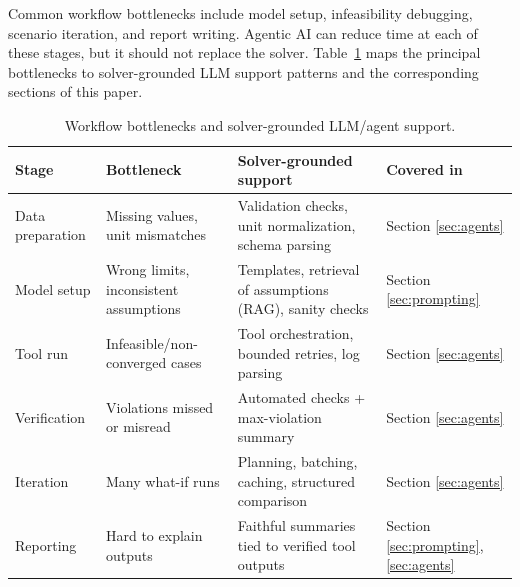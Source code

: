 \documentclass[journal,onecolumn]{IEEEtran} %
\begin{document}
Common workflow bottlenecks include model setup, infeasibility debugging, scenario iteration, and report writing. Agentic AI can reduce time at each of these stages, but it should not replace the solver. Table~\ref{tab:bottlenecks} maps the principal bottlenecks to solver-grounded LLM support patterns and the corresponding sections of this paper.



\begin{table}[ht]
\centering
\caption{Workflow bottlenecks and solver-grounded LLM/agent support.}
\label{tab:bottlenecks}
\begin{tabularx}{\linewidth}{l l X p{2.0cm}}
\toprule
\textbf{Stage} & \textbf{Bottleneck} & \textbf{Solver-grounded support} & \textbf{Covered in} \\
\midrule
Data preparation & Missing values, unit mismatches 
  & Validation checks, unit normalization, schema parsing 
  & Section \ref{sec:agents} \\
Model setup & Wrong limits, inconsistent assumptions 
  & Templates, retrieval of assumptions (RAG), sanity checks 
  & Section \ref{sec:prompting} \\
Tool run & Infeasible/non-converged cases 
  & Tool orchestration, bounded retries, log parsing 
  & Section \ref{sec:agents} \\
Verification & Violations missed or misread 
  & Automated checks + max-violation summary 
  & Section \ref{sec:agents} \\
Iteration & Many what-if runs 
  & Planning, batching, caching, structured comparison 
  & Section \ref{sec:agents} \\
Reporting & Hard to explain outputs 
  & Faithful summaries tied to verified tool outputs 
  & Section \ref{sec:prompting}, \ref{sec:agents} \\
\bottomrule
\end{tabularx}
\end{table}
\end{document}
